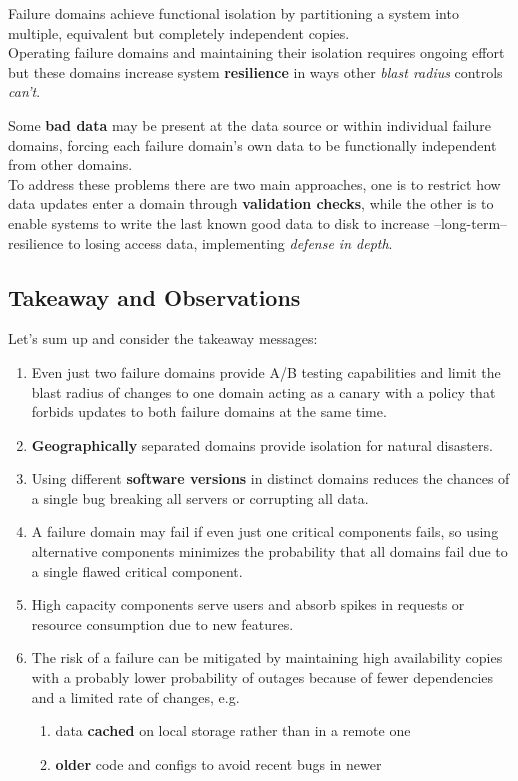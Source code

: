 Failure domains achieve functional isolation by partitioning a system into multiple,
equivalent but completely independent copies.\\
Operating failure domains and maintaining their isolation requires ongoing effort but
these domains increase system \textbf{resilience} in ways other \textit{blast radius} controls \textit{can’t}.

Some \textbf{bad data} may be present at the data source or within individual failure domains,
forcing each failure domain's own data to be functionally independent from other domains.\\
To address these problems there are two main approaches, one is to restrict how data updates enter a domain through \textbf{validation checks},
while the other is to enable systems to write the last known good data to disk to increase {--}long-term{--}resilience to losing access data, implementing \textit{defense in depth}.

\subsection{Takeaway and Observations}

Let's sum up and consider the takeaway messages:
\begin{enumerate}
   \item Even just two failure domains provide A/B testing capabilities and limit the blast
   radius of changes to one domain acting as a canary with a policy that forbids
   updates to both failure domains at the same time.
   \item \textbf{Geographically} separated domains provide isolation for natural disasters.
   \item Using different \textbf{software versions} in distinct domains reduces the chances of a
   single bug breaking all servers or corrupting all data.
   \item A failure domain may fail if even just one critical components fails, so using alternative components minimizes the probability that all domains fail due to a single flawed critical component.
   \item High capacity components serve users and absorb spikes in requests or resource consumption due to new features.
   \item The risk of a failure can be mitigated by maintaining high availability copies with a probably lower probability of outages because of fewer dependencies and a limited rate of
   changes, e.g.
   \begin{enumerate}
      \item data \textbf{cached} on local storage rather than in a remote one
      \item \textbf{older} code and configs to avoid recent bugs in newer
   \end{enumerate}
\end{enumerate}

